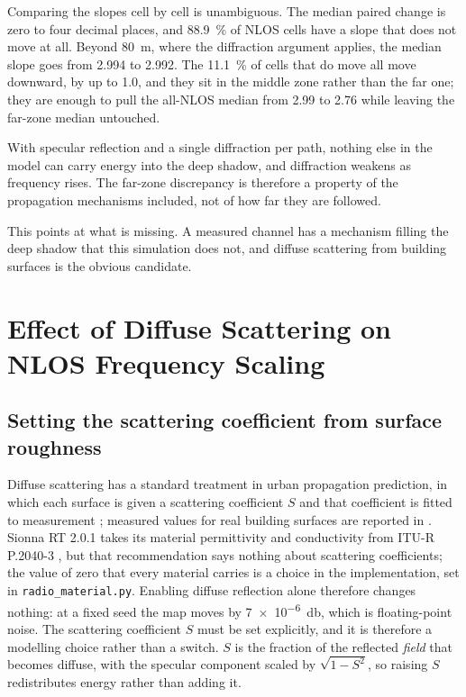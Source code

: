 \documentclass[conference]{IEEEtran}
\begin{document}
Comparing the slopes cell by cell is unambiguous. The median paired change is
zero to four decimal places, and \SI{88.9}{\percent} of NLOS cells have a
slope that does not move at all. Beyond \SI{80}{\metre}, where the diffraction
argument applies, the median slope goes from \num{2.994} to \num{2.992}. The
\SI{11.1}{\percent} of cells that do move all move downward, by up to
\num{1.0}, and they sit in the middle zone rather than the far one; they are
enough to pull the all-NLOS median from \num{2.99} to \num{2.76} while
leaving the far-zone median untouched.

With specular reflection and a single diffraction per path, nothing else in
the model can carry energy into the deep shadow, and diffraction weakens as
frequency rises. The far-zone discrepancy is therefore a property of the
propagation mechanisms included, not of how far they are followed.

This points at what is missing. A measured channel has a mechanism filling the
deep shadow that this simulation does not, and diffuse scattering from building
surfaces is the obvious candidate.

\section{Effect of Diffuse Scattering on NLOS Frequency Scaling}
\label{sec:scattering}

\subsection{Setting the scattering coefficient from surface roughness}

Diffuse scattering has a standard treatment in urban propagation prediction,
in which each surface is given a scattering coefficient $S$ and that
coefficient is fitted to measurement
\cite{degliesposti2001diffuse, degliesposti2004advanced}; measured values for
real building surfaces are reported in \cite{degliesposti2007measurement}.
Sionna RT 2.0.1 takes its material permittivity and conductivity from
ITU-R P.2040-3 \cite{iturp2040}, but that recommendation says nothing about
scattering coefficients; the value of zero that every material carries is a
choice in the implementation, set in \texttt{radio\_\hspace{0pt}material.py}.
Enabling diffuse reflection alone therefore changes nothing: at a fixed seed the map
moves by \SI{7e-6}{\decibel}, which is floating-point noise. The scattering
coefficient $S$ must be set explicitly, and it is therefore a modelling choice
rather than a switch. $S$ is the fraction of the reflected \emph{field} that
becomes diffuse, with the specular component scaled by $\sqrt{1-S^2}$, so
raising $S$ redistributes energy rather than adding it.
\end{document}

